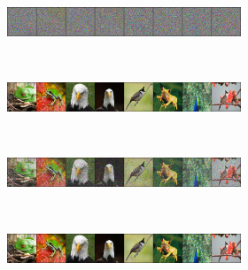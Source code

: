 \documentclass[conference]{IEEEtran}
\theoremstyle{definition}
\theoremstyle{remark}
\theoremstyle{proposition}
\begin{document}
\begin{figure}[htp!]
	\ContinuedFloat\centering
    \vspace{-3em}
    \begin{subfigure}{.90\textwidth}
        \hspace{0.95em}
    	\begin{subfigure}{.90\textwidth}
    		\centering
    		\includegraphics[width=1.0\textwidth, valign=c]{samples/ImageNet-ADV/pert_adv.png}
    	\end{subfigure}\\
        \hspace{0.75em}
    	\begin{subfigure}{.90\textwidth}
    		\centering
    		\includegraphics[width=1.0\textwidth, valign=c]{samples/ImageNet-ADV/original_input.png}
    	\end{subfigure}\\
        \hspace{0.75em}
    	\begin{subfigure}{.90\textwidth}
    		\centering
    		\includegraphics[width=1.0\textwidth, valign=c]{samples/ImageNet-ADV/init_0.png}
    	\end{subfigure}\\
        \hspace{0.95em}
    	\begin{subfigure}{.90\textwidth}
    		\centering
    		\includegraphics[width=1.0\textwidth, valign=c]{samples/ImageNet-ADV/samples_0.png}
    	\end{subfigure}

\end{subfigure}
\end{figure}
\end{document}
